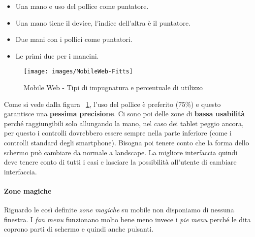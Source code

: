					\begin{itemize}
						\item Una mano e uso del pollice come puntatore.
						\item Una mano tiene il device, l'indice dell'altra è il puntatore.
						\item Due mani con i pollici come puntatori.
						\item Le primi due per i mancini.
					\end{itemize}
					
					\begin{figure}[h]
						\centering
						\texttt{[image: images/MobileWeb-Fitts]}	
						\caption[Mobile Web - Impugnature e utilizzo] {Mobile Web - Tipi di impugnatura e percentuale di utilizzo}
						\label{fig:MobileWeb-Fitts}
					\end{figure}
					
					Come si vede dalla figura ~\ref{fig:MobileWeb-Fitts}, l'uso del pollice è preferito (75\%) e questo garantisce una \textbf{pessima precisione}. Ci sono poi delle zone di \textbf{bassa usabilità} perché raggiungibili solo allungando la mano, nel caso dei tablet peggio ancora, per questo i controlli dovrebbero essere sempre nella parte inferiore (come i controlli standard degli smartphone). Bisogna poi tenere conto che la forma dello schermo può cambiare da normale a landscape. La migliore interfaccia quindi deve tenere conto di tutti i casi e lasciare la possibilità all'utente di cambiare interfaccia.
					\paragraph{Zone magiche}
						Riguardo le così definite \emph{zone magiche} su mobile non disponiamo di nessuna finestra. I \emph{fan menu} funzionano molto bene meno invece i \emph{pie menu} perché le dita coprono parti di schermo e quindi anche pulsanti.
					